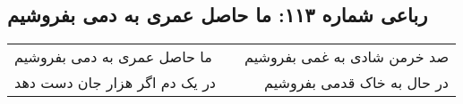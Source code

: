 \begin{center}
\section*{رباعی شماره ۱۱۳: ما حاصل عمری به دمی بفروشیم}
\label{sec:113}
\begin{longtable}{l p{0.5cm} r}
ما حاصل عمری به دمی بفروشیم
&&
صد خرمن شادی به غمی بفروشیم
\\
در یک دم اگر هزار جان دست دهد
&&
در حال به خاک قدمی بفروشیم
\\
\end{longtable}
\end{center}
